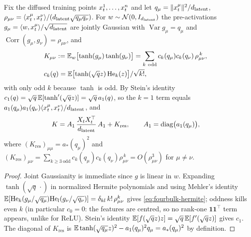 \begin{lemma}\label{lem:fourbulk-kernel}
Fix the diffused training points $x_t^1,\dots,x_t^n$ and let $q_\mu=\|x_t^\mu\|^2/d_{\mathrm{latent}}$, $\rho_{\mu\nu}=\langle x_t^\mu,x_t^\nu\rangle/(d_{\mathrm{latent}}\sqrt{q_\mu q_\nu})$. For $w\sim\mathcal N(0,I_{d_{\mathrm{latent}}})$ the pre-activations $g_\mu=\langle w,x_t^\mu\rangle/\sqrt{d_{\mathrm{latent}}}$ are jointly Gaussian with $\operatorname{Var}g_\mu=q_\mu$ and $\operatorname{Corr}(g_\mu,g_\nu)=\rho_{\mu\nu}$, and
\begin{equation}\label{eq:fourbulk-hermite}
\begin{aligned}
&K_{\mu\nu}:=\mathbb{E}_w\bigl[\tanh(g_\mu)\tanh(g_\nu)\bigr]
  =\sum_{k\ \mathrm{odd}} c_k(q_\mu)c_k(q_\nu)\,\rho_{\mu\nu}^{\,k},\\ &
  c_k(q)=\mathbb{E}\bigl[\tanh(\sqrt q z)\,\mathrm{He}_k(z)\bigr]/\sqrt{k!},
\end{aligned}
\end{equation}
with only odd $k$ because $\tanh$ is odd. By Stein's identity $c_1(q)=\sqrt q\,\mathbb{E}[\tanh'(\sqrt q z)]=\sqrt q\,a_1(q)$, so the $k=1$ term equals $a_1(q_\mu)a_1(q_\nu)\langle x_t^\mu,x_t^\nu\rangle/d_{\mathrm{latent}}$, and
\begin{equation}\label{eq:fourbulk-Ksplit}
  K = A_1\,\frac{X_tX_t^\top}{d_{\mathrm{latent}}}\,A_1 + K_{\mathrm{res}},\qquad A_1=\operatorname{diag}\bigl(a_1(q_\mu)\bigr),
\end{equation}
where $(K_{\mathrm{res}})_{\mu\mu}=a_*(q_\mu)^2$ and $(K_{\mathrm{res}})_{\mu\nu}=\sum_{k\ge3\ \mathrm{odd}}c_k(q_\mu)c_k(q_\nu)\rho_{\mu\nu}^{\,k}=O(\rho_{\mu\nu}^3)$ for $\mu\ne\nu$.
\end{lemma}
\begin{proof}
Joint Gaussianity is immediate since $g$ is linear in $w$. Expanding $\tanh(\sqrt{q}\,\cdot)$ in normalized Hermite polynomials and using Mehler's identity $\mathbb{E}[\mathrm{He}_k(g_\mu/\sqrt{q_\mu})\mathrm{He}_l(g_\nu/\sqrt{q_\nu})]=\delta_{kl}\,k!\,\rho_{\mu\nu}^k$ gives \eqref{eq:fourbulk-hermite}; oddness kills even $k$ (in particular $c_0=0$: the features are centred, so no rank-one $\mathbf 1\mathbf 1^\top$ term appears, unlike for ReLU). Stein's identity $\mathbb{E}[f(\sqrt q z)z]=\sqrt q\,\mathbb{E}[f'(\sqrt q z)]$ gives $c_1$. The diagonal of $K_{\mathrm{res}}$ is $\mathbb{E}\tanh(\sqrt{q_\mu}z)^2-a_1(q_\mu)^2q_\mu=a_*(q_\mu)^2$ by definition.
\end{proof}

